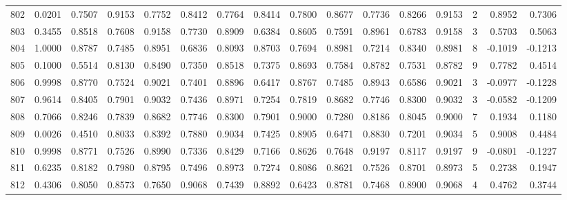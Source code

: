 \begin{tabular}{lrrrrrrrrrrrrrrr}
802 &      0.0201 &  0.7507 &  0.9153 &  0.7752 &  0.8412 &  0.7764 &  0.8414 &  0.7800 &  0.8677 &  0.7736 &   0.8266 &     0.9153 &      2 &                    0.8952 &                     0.7306 \\
803 &      0.3455 &  0.8518 &  0.7608 &  0.9158 &  0.7730 &  0.8909 &  0.6384 &  0.8605 &  0.7591 &  0.8961 &   0.6783 &     0.9158 &      3 &                    0.5703 &                     0.5063 \\
804 &      1.0000 &  0.8787 &  0.7485 &  0.8951 &  0.6836 &  0.8093 &  0.8703 &  0.7694 &  0.8981 &  0.7214 &   0.8340 &     0.8981 &      8 &                   -0.1019 &                    -0.1213 \\
805 &      0.1000 &  0.5514 &  0.8130 &  0.8490 &  0.7350 &  0.8518 &  0.7375 &  0.8693 &  0.7584 &  0.8782 &   0.7531 &     0.8782 &      9 &                    0.7782 &                     0.4514 \\
806 &      0.9998 &  0.8770 &  0.7524 &  0.9021 &  0.7401 &  0.8896 &  0.6417 &  0.8767 &  0.7485 &  0.8943 &   0.6586 &     0.9021 &      3 &                   -0.0977 &                    -0.1228 \\
807 &      0.9614 &  0.8405 &  0.7901 &  0.9032 &  0.7436 &  0.8971 &  0.7254 &  0.7819 &  0.8682 &  0.7746 &   0.8300 &     0.9032 &      3 &                   -0.0582 &                    -0.1209 \\
808 &      0.7066 &  0.8246 &  0.7839 &  0.8682 &  0.7746 &  0.8300 &  0.7901 &  0.9000 &  0.7280 &  0.8186 &   0.8045 &     0.9000 &      7 &                    0.1934 &                     0.1180 \\
809 &      0.0026 &  0.4510 &  0.8033 &  0.8392 &  0.7880 &  0.9034 &  0.7425 &  0.8905 &  0.6471 &  0.8830 &   0.7201 &     0.9034 &      5 &                    0.9008 &                     0.4484 \\
810 &      0.9998 &  0.8771 &  0.7526 &  0.8990 &  0.7336 &  0.8429 &  0.7166 &  0.8626 &  0.7648 &  0.9197 &   0.8117 &     0.9197 &      9 &                   -0.0801 &                    -0.1227 \\
811 &      0.6235 &  0.8182 &  0.7980 &  0.8795 &  0.7496 &  0.8973 &  0.7274 &  0.8086 &  0.8621 &  0.7526 &   0.8701 &     0.8973 &      5 &                    0.2738 &                     0.1947 \\
812 &      0.4306 &  0.8050 &  0.8573 &  0.7650 &  0.9068 &  0.7439 &  0.8892 &  0.6423 &  0.8781 &  0.7468 &   0.8900 &     0.9068 &      4 &                    0.4762 &                     0.3744 \\

\end{tabular}
